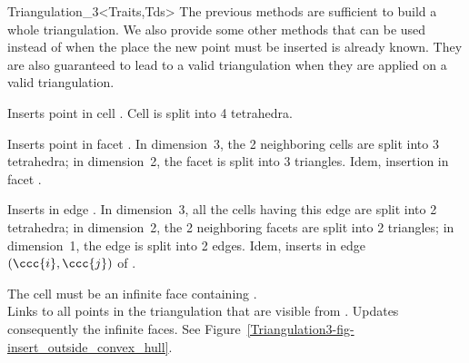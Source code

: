 \begin{ccClassTemplate}{Triangulation_3<Traits,Tds>}
The previous methods are sufficient to build a whole triangulation. We
also provide some other methods that can be used instead of
 when the place the new point  must be inserted
is already known. They are also guaranteed to lead to a valid
triangulation when they are applied on a valid triangulation.

{Inserts point  in cell . Cell  is split into 4
tetrahedra.
} 

{Inserts point  in facet . In dimension~3, the 2
neighboring cells are split into 3 tetrahedra; in dimension~2, the facet 
is split into 3 triangles.
}
\ccGlue
{}
{Idem, insertion in facet .
}

{Inserts  in edge . In dimension~3, 
all the cells having this edge are split into 2 tetrahedra; in
dimension~2, the 2 neighboring facets are split into 2 triangles; in
dimension~1, the edge is split into 2 edges.
}
\ccGlue
{} 
{Idem, inserts  in edge $(\ccc{i}, \ccc{j})$ of .
} 

{%
The cell  must be an infinite face containing \ccVar.\\
Links  to all  points in the triangulation that are visible from
. Updates consequently the infinite faces. See
Figure~\ref{Triangulation3-fig-insert_outside_convex_hull}.
}


\end{ccClassTemplate}
